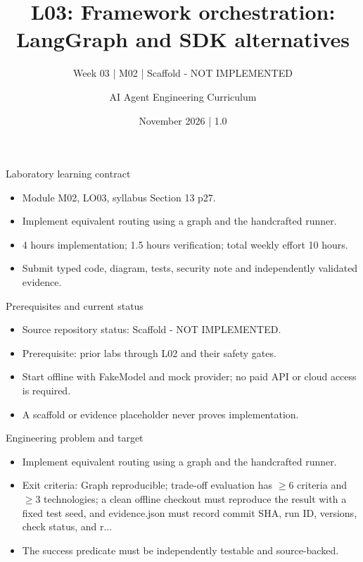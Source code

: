 \documentclass[aspectratio=169,10pt]{beamer}
\title[L03 - Agent Engineering]{L03: Framework orchestration: LangGraph and SDK alternatives}
\subtitle{Week 03 | M02 | Scaffold - NOT IMPLEMENTED}
\author{AI Agent Engineering Curriculum}
\date{November 2026 | 1.0}
\begin{document}
\begin{frame}\titlepage\end{frame}

\begin{frame}{Laboratory learning contract}
\small
\begin{itemize}
\item Module M02, LO03, syllabus Section 13 p27.
\item Implement equivalent routing using a graph and the handcrafted runner.
\item 4 hours implementation; 1.5 hours verification; total weekly effort 10 hours.
\item Submit typed code, diagram, tests, security note and independently validated evidence.
\end{itemize}

\end{frame}

\begin{frame}{Prerequisites and current status}
\small
\begin{itemize}
\item Source repository status: Scaffold - NOT IMPLEMENTED.
\item Prerequisite: prior labs through L02 and their safety gates.
\item Start offline with FakeModel and mock provider; no paid API or cloud access is required.
\item A scaffold or evidence placeholder never proves implementation.
\end{itemize}

\end{frame}

\begin{frame}{Engineering problem and target}
\small
\begin{itemize}
\item Implement equivalent routing using a graph and the handcrafted runner.
\item Exit criteria: Graph reproducible; trade-off evaluation has $\geq$6 criteria and $\geq$3 technologies; a clean offline checkout must reproduce the result with a fixed test seed, and evidence.json must record commit SHA, run ID, versions, check status, and r...
\item The success predicate must be independently testable and source-backed.
\end{itemize}

\end{frame}
\end{document}
